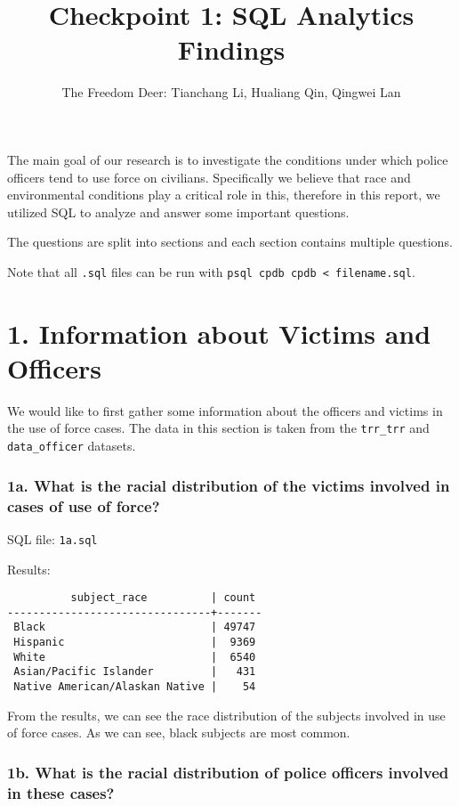 \documentclass[10pt]{article}
\title{Checkpoint 1: SQL Analytics Findings}
\author{The Freedom Deer: Tianchang Li, Hualiang Qin, Qingwei Lan}
\begin{document}
\maketitle

The main goal of our research is to investigate the conditions under which police officers tend to use force on civilians. Specifically we believe that race and environmental conditions play a critical role in this, therefore in this report, we utilized SQL to analyze and answer some important questions.

The questions are split into sections and each section contains multiple questions.

Note that all \texttt{.sql} files can be run with \texttt{psql cpdb cpdb < filename.sql}.

\section*{1. Information about Victims and Officers}

We would like to first gather some information about the officers and victims in the use of force cases. The data in this section is taken from the \texttt{trr\_trr} and \texttt{data\_officer} datasets.

\subsubsection*{1a. What is the racial distribution of the victims involved in cases of use of force?}

SQL file: \texttt{1a.sql}

Results:

\begin{verbatim}
          subject_race          | count
--------------------------------+-------
 Black                          | 49747
 Hispanic                       |  9369
 White                          |  6540
 Asian/Pacific Islander         |   431
 Native American/Alaskan Native |    54
\end{verbatim}

From the results, we can see the race distribution of the subjects involved in use of force cases. As we can see, black subjects are most common.


\subsubsection*{1b. What is the racial distribution of police officers involved in these cases?}
\end{document}
